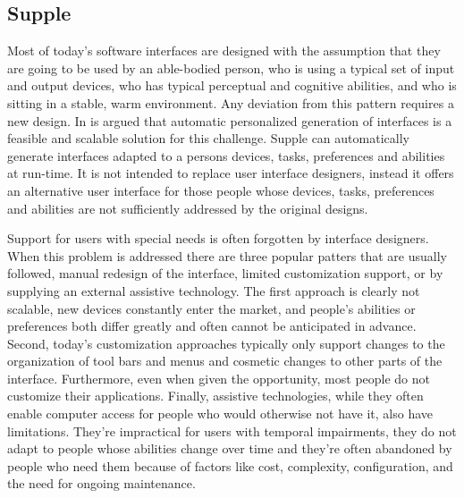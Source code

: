\subsection{Supple}
\label{subsection:Supple}

Most of today's software interfaces are designed with the assumption that they are going to be used by an able-bodied person, who is using a typical set of input and output devices, who has typical perceptual and cognitive abilities, and who is sitting in a stable, warm environment. Any deviation from this pattern requires a new design. In \cite{supple} is argued that automatic personalized generation of interfaces is a feasible and scalable solution for this challenge. Supple can automatically generate interfaces adapted to a persons devices, tasks, preferences and abilities at run-time. It is not intended to replace user interface designers, instead it offers an alternative user interface for those people whose devices, tasks, preferences and abilities are not sufficiently addressed by the original designs.

Support for users with special needs is often forgotten by interface designers. When this problem is addressed there are three popular patters that are usually followed, manual redesign of the interface, limited customization support, or by supplying an external assistive technology. The first approach is clearly not scalable, new devices constantly enter the market, and people's abilities or preferences both differ greatly and often cannot be anticipated in advance. Second, today's customization approaches typically only support changes to the organization of tool bars and menus and cosmetic changes to other parts of the interface. Furthermore, even when given the opportunity, most people do not customize their applications. Finally, assistive technologies, while they often enable computer access for people who would otherwise not have it, also have limitations. They're impractical for users with temporal impairments, they do not adapt to people whose abilities change over time and they're often abandoned by people who need them because of factors like cost, complexity, configuration, and the need for ongoing maintenance.

